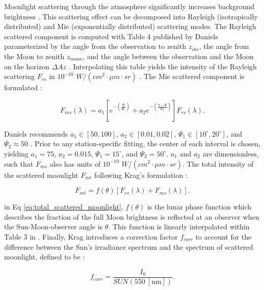 Moonlight scattering through the atmosphere significantly increases background brightness \cite{krag2003}. This scattering effect can be decomposed into Rayleigh (isotropically distributed) and Mie (exponentially distributed) scattering modes. The Rayleigh scattered component is computed with Table 4 published by Daniels parameterized by the angle from the observation to zenith $z_{obs}$, the angle from the Moon to zenith $z_{moon}$, and the angle between the observation and the Moon on the horizon $\Delta Az$ \cite{daniels1977}. Interpolating this table yields the intensity of the Rayleigh scattering $F_{rs}$ in $10^{-10}$ $W/(cm^2 \cdot \mu m \cdot sr)$ \cite{krag2003}. The Mie scattered component is formulated \cite{krag2003}:

\begin{equation} \label{eq:mie_scattering_moon}
  F_{ms}(\lambda) = a_1 \left[ e^{-\left(\frac{\Psi}{\Psi_1}\right)} + a_2 e^{-\left(\frac{\pi - \Psi}{\Psi_2}\right)} \right] F_{rs}(\lambda).
\end{equation}

Daniels recommends $a_1 \in [50, 100]$, $a_2 \in [0.01, 0.02]$, $\Psi_1 \in [10^\circ, 20^\circ]$, and $\Psi_2 \approx 50$ \cite{daniels1977}. Prior to any station-specific fitting, the center of each interval is chosen, yielding $a_1 = 75$, $a_2 = 0.015$, $\Psi_1 = 15^\circ$, and $\Psi_2 = 50^\circ$. $a_1$ and $a_2$ are dimensionless, such that $F_{ms}$ also has units of $10^{-10}$ $W/(cm^2 \cdot \mu m \cdot sr)$. The total intensity of the scattered moonlight $F_{mt}$ following Krag's formulation \cite{krag2003}:

\begin{equation} \label{eq:total_scattered_moonlight}
  F_{mt} = f(\theta) \left[ F_{rs}(\lambda) + F_{ms}(\lambda) \right].
\end{equation}

in Eq \ref{eq:total_scattered_moonlight}, $f(\theta)$ is the lunar phase function which describes the fraction of the full Moon brightness is reflected at an observer when the Sun-Moon-observer angle is $\theta$. This function is linearly interpolated within Table 3 in \cite{daniels1977}. Finally, Krag introduces a correction factor $f_{corr}$ to account for the difference between the Sun's irradiance spectrum and the spectrum of scattered moonlight, defined to be \cite{krag2003}:

\begin{equation} \label{eq:krag_f_corr}
  f_{corr} = \frac{I_0}{SUN(550 \: \left[\textrm{nm}\right])}.
\end{equation}

